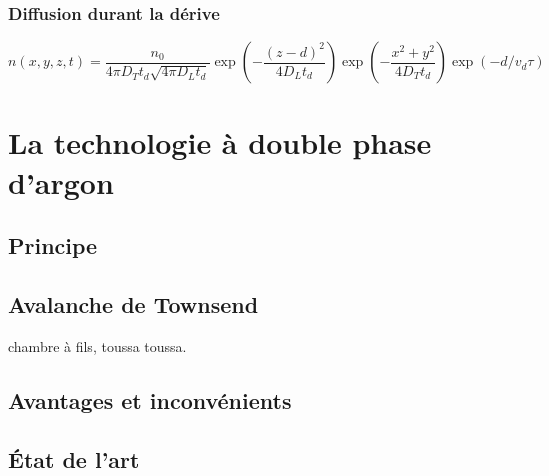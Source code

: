       \subsubsection{Diffusion durant la dérive}
        \begin{equation}\label{eq::diffusion}
          n(x,y,z,t) = \frac{n_0}{4\pi D_T t_d\sqrt{4\pi D_L t_d}}\exp\left(-\frac{(z-d)^2}{4D_L t_d}\right)\exp\left(-\frac{x^2+y^2}{4D_T t_d}\right)\exp\left(-d/v_d\tau\right)
        \end{equation}
    
  \section{La technologie à double phase d'argon}
    \subsection{Principe}
    \subsection{Avalanche de Townsend}
      chambre à fils, toussa toussa.
    \subsection{Avantages et inconvénients}
    \subsection{État de l'art}
    
